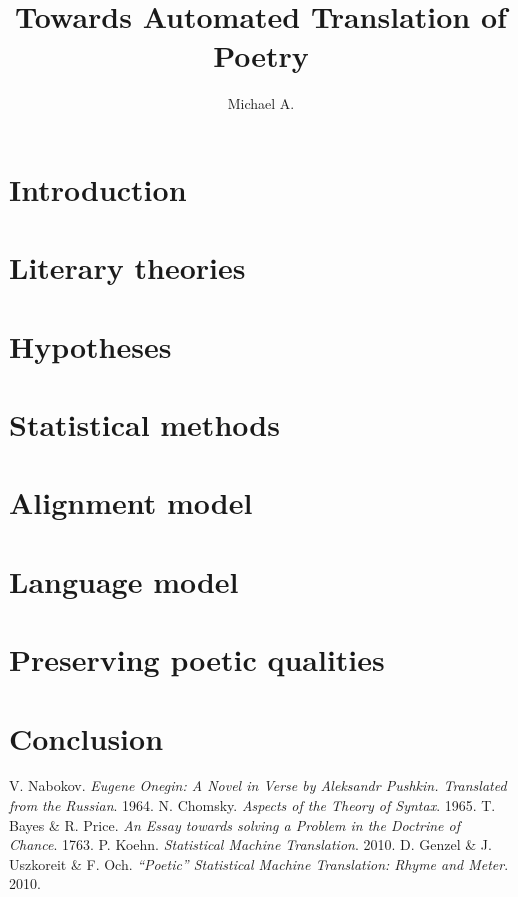 \documentclass[a1, plainboxedsections, 13pt]{sciposter}
\begin{document}
\title{{\Huge Towards Automated Translation of Poetry}}
\author{{\Large Michael A.}}
\maketitle
{}

\begin{multicols}{3}
  \section*{Introduction}
  
  \section*{Literary theories}
  
  \section*{Hypotheses}
  
  \section*{Statistical methods}
  
  \section*{Alignment model}
  
  \vfill\null\columnbreak       
  \section*{Language model}
  
  \section*{Preserving poetic qualities}
  
  \section*{Conclusion}
  
  \begin{thebibliography}{10}
   V. Nabokov. {\it Eugene Onegin: A Novel in Verse by
      Aleksandr Pushkin. Translated from the Russian}. 1964.
   N. Chomsky. {\it Aspects of the Theory of
      Syntax}. 1965.
   T. Bayes \& R. Price. {\it An Essay towards solving a
      Problem in the Doctrine of Chance}. 1763.
   P. Koehn. {\it Statistical Machine
      Translation}. 2010.
   D. Genzel \& J. Uszkoreit \& F. Och. {\it ``Poetic''
      Statistical Machine Translation: Rhyme and Meter}. 2010.
  \end{thebibliography}
\end{multicols}
\end{document}
